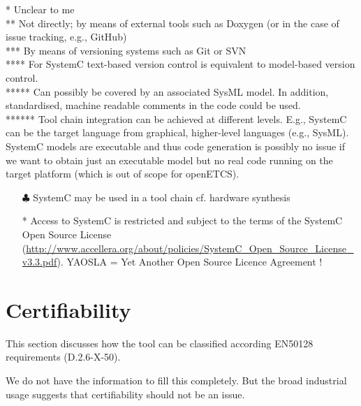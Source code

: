 \begin{author_comment}
  * Unclear to me\\
  ** Not directly; by means of external tools such as Doxygen (or in the case of issue tracking, e.g., GitHub)\\
 *** By means of versioning systems such as Git or SVN\\
**** For SystemC text-based version control is equivalent to model-based version control.\\
***** Can possibly be covered by an associated SysML model. In addition, standardised, machine readable comments in the code could be used.\\
****** Tool chain integration can be achieved at different levels. E.g., SystemC can be the target language from graphical, higher-level languages (e.g., SysML). SystemC models are executable and thus code generation is possibly no issue if we want to obtain just an executable model but no real code running on the target platform (which is out of scope for openETCS).
\end{author_comment}
\begin{assessor1}
\begin{itemize}
\item[$\clubsuit$] SystemC may be used in a tool chain cf. hardware synthesis
\end{itemize}
\end{assessor1}



\begin{assessor2}
  \begin{itemize}
  \item[*] Access to SystemC is restricted and subject to the terms of
    the SystemC Open Source License
    (\url{http://www.accellera.org/about/policies/SystemC_Open_Source_License_v3.3.pdf}). YAOSLA
    = Yet Another Open Source Licence Agreement !
  \end{itemize}  
\end{assessor2}


\section{Certifiability}

This section discusses how the tool can be classified according EN50128 requirements (D.2.6-X-50).

\begin{author_comment}
  We do not have the information to fill this completely. But the broad industrial usage suggests that certifiability should not be an issue.
\end{author_comment}

